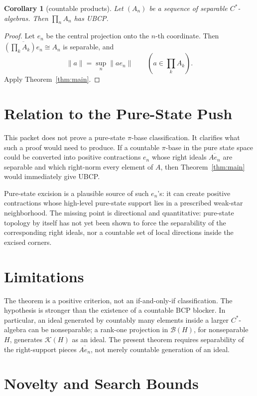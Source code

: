 \documentclass[11pt]{article}
\newtheorem{corollary}{Corollary}
\newcommand{\cl}{\overline}
\begin{document}
\begin{corollary}[countable products]
Let \((A_n)\) be a sequence of separable \(C^*\)-algebras.  Then
\(\prod_n A_n\) has UBCP.
\end{corollary}

\begin{proof}
Let \(e_n\) be the central projection onto the \(n\)-th coordinate.  Then
\(\cl{(\prod_k A_k)e_n}\cong A_n\) is separable, and
\[
        \|a\|=\sup_n \|ae_n\|
        \qquad(a\in \prod_k A_k).
\]
Apply Theorem~\ref{thm:main}.
\end{proof}

\section*{Relation to the Pure-State Push}

This packet does not prove a pure-state \(\pi\)-base classification.  It
clarifies what such a proof would need to produce.  If a countable
\(\pi\)-base in the pure state space could be converted into positive
contractions \(e_n\) whose right ideals \(\cl{Ae_n}\) are separable and which
right-norm every element of \(A\), then Theorem~\ref{thm:main} would
immediately give UBCP.

Pure-state excision is a plausible source of such \(e_n\)'s: it can create
positive contractions whose high-level pure-state support lies in a prescribed
weak-star neighborhood.  The missing point is directional and quantitative:
pure-state topology by itself has not yet been shown to force the separability
of the corresponding right ideals, nor a countable set of local directions
inside the excised corners.

\section*{Limitations}

The theorem is a positive criterion, not an if-and-only-if classification.
The hypothesis is stronger than the existence of a countable BCP blocker.  In
particular, an ideal generated by countably many elements inside a larger
\(C^*\)-algebra can be nonseparable; a rank-one projection in
\(\mathcal B(H)\), for nonseparable \(H\), generates \(\mathcal K(H)\) as an
ideal.  The present theorem requires separability of the right-support pieces
\(\cl{Ae_n}\), not merely countable generation of an ideal.

\section*{Novelty and Search Bounds}
\end{document}
